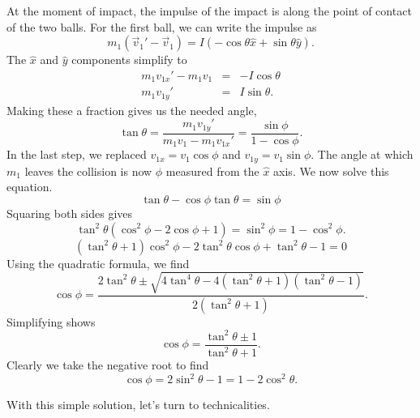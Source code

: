 \documentclass{article}
\newcommand{\xh}{\hat{x}}
\newcommand{\yh}{\hat{y}}
\newcommand{\be}{\begin{equation}}
\newcommand{\ee}{\end{equation}}
\begin{document}
At the moment of impact, the impulse of the impact is along the point
of contact of the two balls.  For the first ball, we can write the impulse
as
\begin{equation}
  m_1(\vec{v}_1'-\vec{v}_1) = I (-\cos\theta\xh+\sin\theta\yh).
\end{equation}
The $\xh$ and $\yh$ components simplify to
\begin{eqnarray}
  m_1v_{1x}'-m_1v_1 & = & -I\cos\theta \\
  m_1v_{1y}' & = & I\sin\theta.
\end{eqnarray}
Making these a fraction gives us the needed angle,
\begin{equation}
  \tan\theta = \frac{m_1v_{1y}'}{m_1v_1-m_1v_{1x}'}=
  \frac{\sin{\phi}}{1-\cos{\phi}}.
\end{equation}
In the last step, we replaced $v_{1x}=v_1\cos{\phi}$ and
$v_{1y}=v_1\sin{\phi}$.  The angle at which $m_1$ leaves the collision is now
$\phi$ measured from the $\xh$ axis.
We now solve this equation.
\be
  \tan\theta-\cos\phi\tan\theta=\sin\phi
\ee
Squaring both sides gives
\be
  \tan^2\theta(\cos^2\phi-2\cos\phi+1)=\sin^2\phi=1-\cos^2\phi.
\ee
\be
  (\tan^2\theta+1)\cos^2\phi-2\tan^2\theta\cos\phi+\tan^2\theta-1 = 0
\ee
Using the quadratic formula, we find
\be
  \cos\phi=\frac{2\tan^2\theta\pm\sqrt{4\tan^4\theta-4(\tan^2\theta+1)
  (\tan^2\theta-1)}}{2(\tan^2\theta+1)}.
\ee
Simplifying shows
\be
  \cos\phi = \frac{\tan^2\theta\pm1}{\tan^2\theta+1}.
\ee
Clearly we take the negative root to find
\be
  \cos\phi = 2\sin^2\theta - 1 = 1-2\cos^2\theta.
\ee

With this simple solution, let's turn to technicalities.
\end{document}

